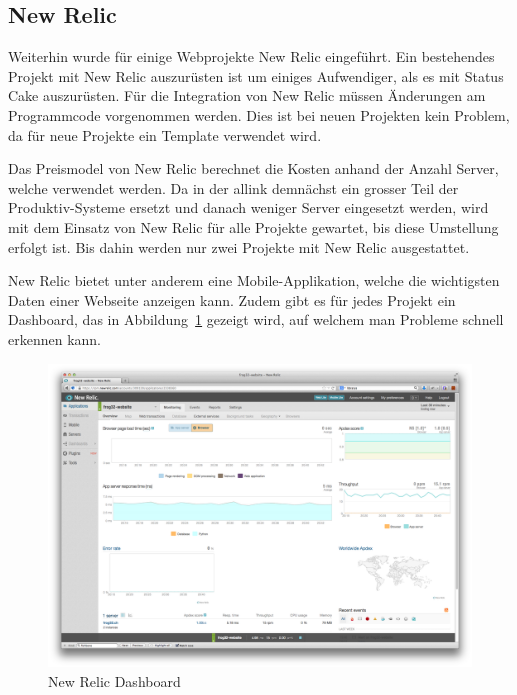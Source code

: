 \subsection{New Relic}
\label{sub:new_relic}
Weiterhin wurde für einige Webprojekte New Relic eingeführt. Ein bestehendes Projekt mit New Relic auszurüsten ist um einiges Aufwendiger, als es mit Status Cake auszurüsten. Für die Integration von New Relic müssen Änderungen am Programmcode vorgenommen werden. Dies ist bei neuen Projekten kein Problem, da für neue Projekte ein Template verwendet wird.

Das Preismodel von New Relic berechnet die Kosten anhand der Anzahl Server, welche verwendet werden. Da in der allink demnächst ein grosser Teil der Produktiv-Systeme ersetzt und danach weniger Server eingesetzt werden, wird mit dem Einsatz von New Relic für alle Projekte gewartet, bis diese Umstellung erfolgt ist. Bis dahin werden nur zwei Projekte mit New Relic ausgestattet.

New Relic bietet unter anderem eine Mobile-Applikation, welche die wichtigsten Daten einer Webseite anzeigen kann. Zudem gibt es für jedes Projekt ein Dashboard, das in Abbildung~\ref{fig:new_relic_dashboard} gezeigt wird, auf welchem man Probleme schnell erkennen kann.

\begin{figure}[ht]
\centering
\includegraphics[width=1\textwidth]{images/new_relic.png}
\caption{New Relic Dashboard}
\label{fig:new_relic_dashboard}
\end{figure}


